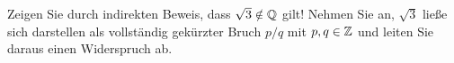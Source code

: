 \item Zeigen Sie durch indirekten Beweis, dass $\sqrt{3} \notin \mathbb{Q}$ gilt! Nehmen Sie an, $\sqrt{3}$ ließe sich darstellen als vollständig gekürzter Bruch $p/q$ mit $p,q\in\mathbb{Z}$ und leiten Sie daraus einen Widerspruch ab.

